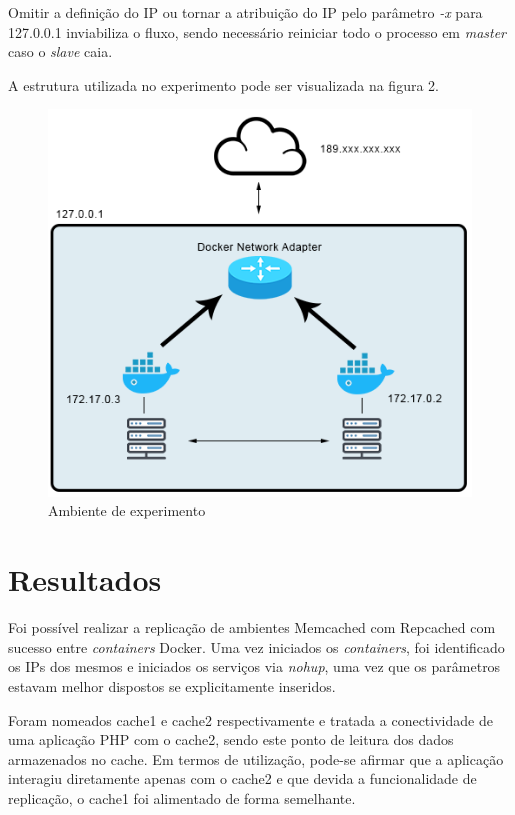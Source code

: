 \documentclass[conference]{IEEEtran}
\begin{document}
Omitir a definição do IP ou tornar a atribuição do IP pelo parâmetro \textit{-x} para 127.0.0.1 inviabiliza o fluxo, sendo necessário reiniciar todo o processo em \textit{master} caso o \textit{slave} caia. 

A estrutura utilizada no experimento pode ser visualizada na figura 2.

\begin{figure}[h!]
\centerline{\includegraphics[width=1\linewidth]{figura2.png}}
\caption{Ambiente de experimento}
\label{fig}
\end{figure}

\section{Resultados} 

Foi possível realizar a replicação de ambientes Memcached com Repcached com sucesso entre \textit{containers} Docker. Uma vez iniciados os \textit{containers}, foi identificado os IPs dos mesmos e iniciados os serviços via \textit{nohup}, uma vez que os parâmetros estavam melhor dispostos se explicitamente inseridos.

Foram nomeados cache1 e cache2 respectivamente e tratada a conectividade de uma aplicação PHP com o cache2, sendo este ponto de leitura dos dados armazenados no cache. Em termos de utilização, pode-se afirmar que a aplicação interagiu diretamente apenas com o cache2 e que devida a funcionalidade de replicação, o cache1 foi alimentado de forma semelhante.
\end{document}
